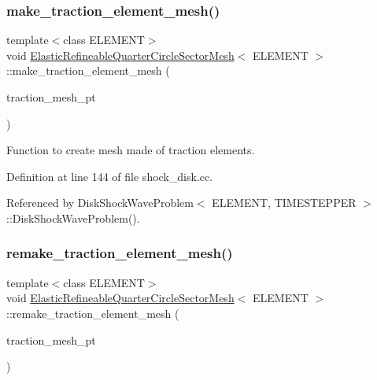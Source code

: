 \subsubsection{\texorpdfstring{make\+\_\+traction\+\_\+element\+\_\+mesh()}{make\_traction\_element\_mesh()}}
{\footnotesize\ttfamily template$<$class E\+L\+E\+M\+E\+NT$>$ \\
void \hyperlink{classElasticRefineableQuarterCircleSectorMesh}{Elastic\+Refineable\+Quarter\+Circle\+Sector\+Mesh}$<$ E\+L\+E\+M\+E\+NT $>$\+::make\+\_\+traction\+\_\+element\+\_\+mesh (\begin{DoxyParamCaption}\item[{Solid\+Mesh $\ast$\&}]{traction\+\_\+mesh\+\_\+pt }\end{DoxyParamCaption})\hspace{0.3cm}{\ttfamily [inline]}}



Function to create mesh made of traction elements. 



Definition at line 144 of file shock\+\_\+disk.\+cc.



Referenced by Disk\+Shock\+Wave\+Problem$<$ E\+L\+E\+M\+E\+N\+T, T\+I\+M\+E\+S\+T\+E\+P\+P\+E\+R $>$\+::\+Disk\+Shock\+Wave\+Problem().

\mbox{\label{classElasticRefineableQuarterCircleSectorMesh_a33ef5828fc64fcf4e50e6c38d626ffcb}} 
\subsubsection{\texorpdfstring{remake\+\_\+traction\+\_\+element\+\_\+mesh()}{remake\_traction\_element\_mesh()}}
{\footnotesize\ttfamily template$<$class E\+L\+E\+M\+E\+NT$>$ \\
void \hyperlink{classElasticRefineableQuarterCircleSectorMesh}{Elastic\+Refineable\+Quarter\+Circle\+Sector\+Mesh}$<$ E\+L\+E\+M\+E\+NT $>$\+::remake\+\_\+traction\+\_\+element\+\_\+mesh (\begin{DoxyParamCaption}\item[{Solid\+Mesh $\ast$\&}]{traction\+\_\+mesh\+\_\+pt }\end{DoxyParamCaption})\hspace{0.3cm}{\ttfamily [inline]}}



